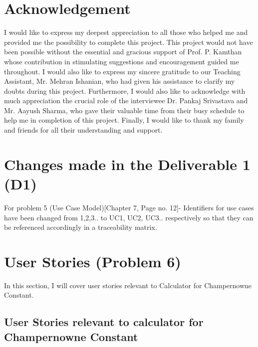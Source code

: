 \documentclass[paper=a4, fontsize=11pt]{report}
\numberwithin{equation}{section}		%
\numberwithin{figure}{section}			%
\numberwithin{table}{section}				%
\begin{document}
\chapter{Acknowledgement}
I would like to express my deepest appreciation to all those who helped me and provided me the possibility to complete this project.
\vskip1mm
This project would not have been possible without the essential and gracious support of Prof. P. Kamthan whose contribution in stimulating suggestions and encouragement guided me throughout.
\vskip1mm
I would also like to express my sincere gratitude to our Teaching Assistant, Mr. Mehran Ishanian, who had given his assistance to clarify my doubts during this project.
\vskip1mm
Furthermore, I would also like to acknowledge with much appreciation the crucial role of the interviewee Dr. Pankaj Srivastava and Mr. Aayush Sharma, who gave their valuable time from their busy schedule to help me in completion of this project. 
\vskip1mm
Finally, I would like to thank my family and friends for all their understanding and support. 


\chapter{Changes made in the Deliverable 1 (D1)}
For problem 5 (Use Case Model)[Chapter 7, Page no. 12]- Identifiers for use cases have been changed from 1,2,3.. to UC1, UC2, UC3.. respectively so that they can be referenced accordingly in a traceability matrix.



\chapter{\gls{User Stories} (Problem 6)}
In this section, I will cover user stories relevant to Calculator for Champernowne Constant. \newline

  
\section{User Stories relevant to calculator for Champernowne Constant }

\end{document}
